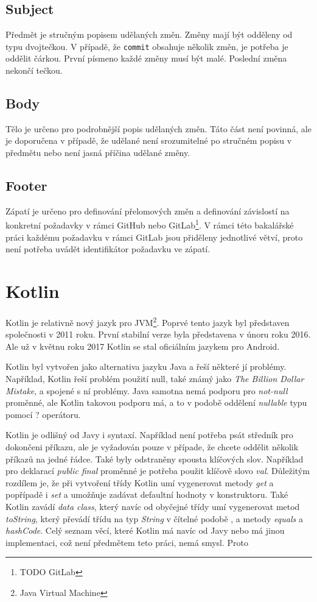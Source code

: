     \subsection{Subject}
        Předmět je stručným popisem udělaných změn. Změny mají být odděleny od typu dvojtečkou. V případě, že \verb|commit| obsahuje několik změn, je potřeba je oddělit čárkou. První písmeno každé změny musí být malé. Poslední změna nekončí tečkou.
    
    \subsection{Body}
        Tělo je určeno pro podrobnější popis udělaných změn. Táto část není povinná, ale je doporučena v případě, že udělané není srozumitelné po stručném popisu v předmětu nebo není jasná příčina udělané změny.
    
    \subsection{Footer}
        Zápatí je určeno pro definování přelomových změn a definování závislostí na konkretní požadavky v rámci GitHub nebo GitLab\footnote{TODO GitLab}. V rámci této bakalářské práci každému požadavku v rámci GitLab jsou přiděleny jednotlivé větví, proto není potřeba uvádět identifikátor požadavku ve zápatí.
    
\section{Kotlin}\label{resere:kotlin}
    Kotlin je relativně nový jazyk pro JVM\footnote{Java Virtual Machine}. Poprvé tento jazyk byl představen společnosti v 2011 roku. První stabilní verze byla představena v únoru roku 2016. Ale už v květnu roku 2017 Kotlin se stal oficiálním jazykem pro Android.
    
    Kotlin byl vytvořen jako alternativa jazyku Java a řeší některé jí problémy. Například, Kotlin řeší problém použití null, také známý jako \textit{The Billion Dollar Mistake}\cite{theBDM}, a spojené s ní problémy. Java samotna nemá podporu pro \textit{not-null} proměnné, ale Kotlin takovou podporu má, a to v podobě oddělení \textit{nullable} typu pomocí ? operátoru.
    
    Kotlin je odlišný od Javy i syntaxí. Například není potřeba psát středník pro dokončeni příkazu, ale je vyžadován pouze v případe, že chcete oddělit několik příkazů na jedné řádce. Také byly odstraněny spousta klíčových slov. Například pro deklarací \textit{public final} proměnné je potřeba použit klíčově slovo \textit{val}. Důležitým rozdílem je, že při vytvoření třídy Kotlin umí vygenerovat metody \textit{get} a popřípadě i \textit{set} a umožňuje zadávat defaultní hodnoty v konstruktoru. Také Kotlin zavádí \textit{data class}, který navíc od obyčejné třídy umí vygenerovat metod \textit{toString}, který převádí třídu na typ \textit{String} v čítelné podobě \cite{Priklad vygenerovane tridy}, a metody \textit{equals} a \textit{hashCode}. Celý seznam věcí, které Kotlin má navíc od Javy nebo má jinou implementaci, což není předmětem teto práci, nemá smysl. Proto 
    
